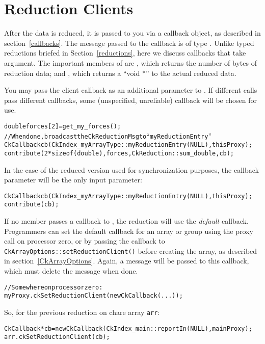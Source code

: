 \section{Reduction Clients}

\label{reductionClients}

After the data is reduced, it is passed to you via a callback object,
as described in section~\ref{callbacks}.  The message passed to
the callback is of type . Unlike typed reductions
briefed in Section~\ref{reductions}, here we discuss callbacks that take 
 argument.
The important members of  are
, which returns the number of bytes of reduction data; and
, which returns a ``void *'' to the actual reduced data.

You may pass the client callback as an additional parameter to .
If different  calls pass different callbacks, some (unspecified,
unreliable) callback will be chosen for use.
\begin{alltt}
    double forces[2]=get_my_forces();
    // When done, broadcast the CkReductionMsg to ``myReductionEntry''
    CkCallback cb(CkIndex_myArrayType::myReductionEntry(NULL), thisProxy);
    contribute(2*sizeof(double), forces,CkReduction::sum_double, cb);
\end{alltt}

In the case of the reduced version used for synchronization purposes, the
callback parameter will be the only input parameter:
\begin{alltt}
    CkCallback cb(CkIndex_myArrayType::myReductionEntry(NULL), thisProxy);
    contribute(cb);
\end{alltt}

If no member passes a callback to , the reduction will use
the {\em default} callback. Programmers can set the default callback for an array or group
using the  proxy call on processor zero, or
by passing the callback to {\tt CkArrayOptions::setReductionClient()}
before creating the array, as described in section~\ref{CkArrayOptions}.
Again, a  message will be passed to this callback,
which must delete the message when done.

\begin{alltt}
    // Somewhere on processor zero:
    myProxy.ckSetReductionClient(new CkCallback(...));
\end{alltt}

So, for the previous reduction on chare array {\tt arr}:
\begin{alltt}
    CkCallback *cb = new CkCallback(CkIndex_main::reportIn(NULL),  mainProxy);
    arr.ckSetReductionClient(cb);
\end{alltt}

